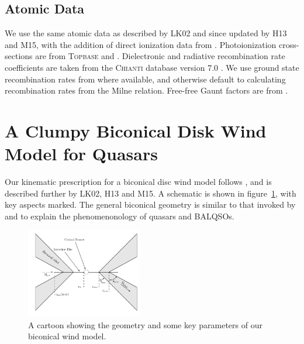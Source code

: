 \documentclass[preprint, a4paper, 11pt]{aastex}
\providecommand{\DIFadd}[1]{{\protect\color{blue}\uwave{#1}}} %
\providecommand{\DIFaddbegin}{} %
\providecommand{\DIFaddend}{} %
\begin{document}


\subsection{Atomic Data}

We use the same atomic data as described by LK02 and since updated by H13 and M15, 
with the addition of direct ionization data from \cite{dere2007}. 
Photoionization cross-sections are from \textsc{Topbase} \citep{cunto1993} and  \cite{vfky}.
Dielectronic and radiative recombination rate coefficients are taken from 
the \textsc{Chianti} database version 7.0 \citep{dere1997,landi2012}.
We use ground state recombination rates from \cite{badnell2006} where available,
and otherwise default to calculating recombination rates from the Milne
relation. Free-free Gaunt factors are from \cite{sutherland1998}.


\DIFaddbegin 

\DIFaddend %
\DIFaddbegin 

\DIFaddend %


\section{A Clumpy Biconical Disk Wind Model for Quasars}

Our kinematic prescription for a biconical disc wind model
follows \cite{SV93}, and is described further by
LK02, H13 and M15. A schematic is shown in figure~\ref{fig:cartoon},
with key aspects marked. The general biconical
geometry is similar to that invoked by \cite{MCGV95} and 
\cite{elvis2000} \DIFaddbegin \DIFadd{in order }\DIFaddend to explain the phenomenonology
of quasars and BALQSOs.


\begin{figure} 
\centering
\includegraphics[width=0.45\textwidth]{figures/fig2_cartoon.png}
\caption
{
A cartoon showing the geometry and some key parameters of
our biconical wind model.
}
\label{fig:cartoon}
\end{figure} 
\end{document}
